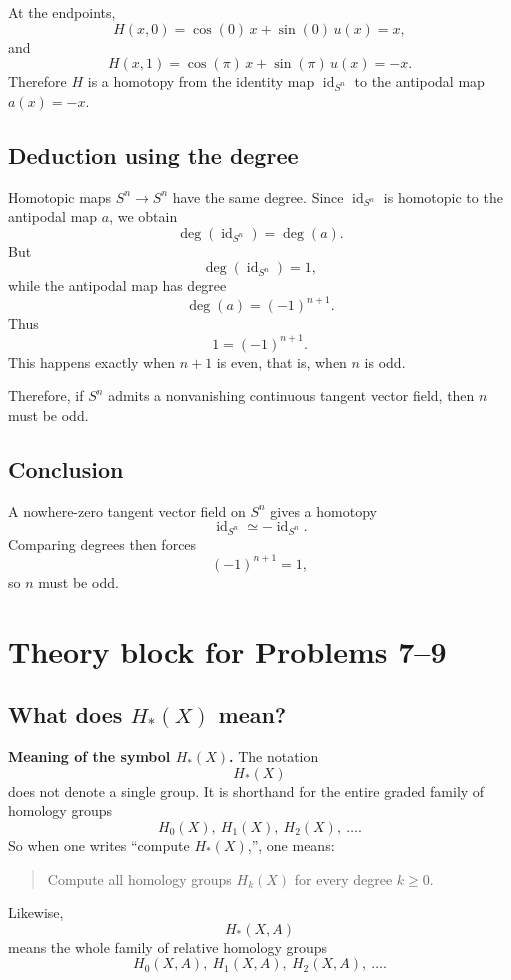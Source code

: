\documentclass[12pt,a4paper]{article}
\theoremstyle{notespace}
\begin{document}
At the endpoints,
\[
H(x,0)=\cos(0)\,x+\sin(0)\,u(x)=x,
\]
and
\[
H(x,1)=\cos(\pi)\,x+\sin(\pi)\,u(x)=-x.
\]
Therefore \(H\) is a homotopy from the identity map \(\operatorname{id}_{S^n}\) to the antipodal map \(a(x)=-x\).

\subsection{Deduction using the degree}

Homotopic maps \(S^n\to S^n\) have the same degree. Since \(\operatorname{id}_{S^n}\) is homotopic to the antipodal map \(a\), we obtain
\[
\deg(\operatorname{id}_{S^n})=\deg(a).
\]
But
\[
\deg(\operatorname{id}_{S^n})=1,
\]
while the antipodal map has degree
\[
\deg(a)=(-1)^{n+1}.
\]
Thus
\[
1=(-1)^{n+1}.
\]
This happens exactly when \(n+1\) is even, that is, when \(n\) is odd.

Therefore, if \(S^n\) admits a nonvanishing continuous tangent vector field, then \(n\) must be odd.

\subsection{Conclusion}

A nowhere-zero tangent vector field on \(S^n\) gives a homotopy
\[
\operatorname{id}_{S^n}\simeq -\operatorname{id}_{S^n}.
\]
Comparing degrees then forces
\[
(-1)^{n+1}=1,
\]
so \(n\) must be odd.

\section{Theory block for Problems 7--9}

\subsection{What does \(H_*(X)\) mean?}

\textbf{Meaning of the symbol \(H_*(X)\).}
The notation
\[
H_*(X)
\]
does not denote a single group. It is shorthand for the entire graded family of homology groups
\[
H_0(X),\ H_1(X),\ H_2(X),\ \dots .
\]
So when one writes ``compute \(H_*(X)\),'', one means:

\begin{quote}
	Compute all homology groups \(H_k(X)\) for every degree \(k\ge 0\).
\end{quote}

Likewise,
\[
H_*(X,A)
\]
means the whole family of relative homology groups
\[
H_0(X,A),\ H_1(X,A),\ H_2(X,A),\ \dots .
\]
\end{document}
